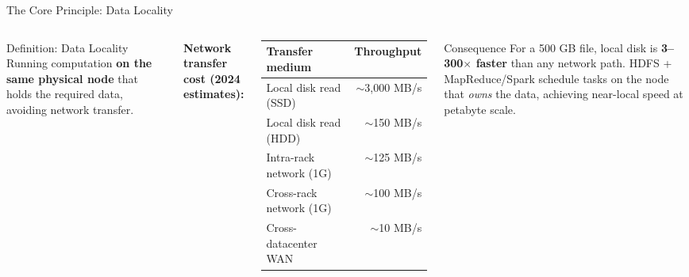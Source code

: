\documentclass[aspectratio=169,10pt]{beamer}
\begin{document}
\begin{frame}{The Core Principle: Data Locality}
  \begin{columns}[T]
      \begin{block}{Definition: Data Locality}
        Running computation \textbf{on the same physical node} that holds the required data, avoiding network transfer.
      \end{block}
      \vspace{6pt}
      \textbf{Network transfer cost (2024 estimates):}
      \vspace{4pt}
      \renewcommand{\arraystretch}{1.25}
      \begin{tabular}{p{3.0cm}r}
        \toprule
        \textbf{Transfer medium} & \textbf{Throughput} \\
        \midrule
        Local disk read (SSD)    & $\sim$3{,}000 MB/s \\
        Local disk read (HDD)    & $\sim$150 MB/s \\
        Intra-rack network (1G)  & $\sim$125 MB/s \\
        Cross-rack network (1G)  & $\sim$100 MB/s \\
        Cross-datacenter WAN     & $\sim$10 MB/s \\
        \bottomrule
      \end{tabular}
      \vspace{6pt}
      \begin{alertblock}{Consequence}
        For a 500 GB file, local disk is \textbf{3--300$\times$ faster} than any network path.  HDFS + MapReduce/Spark schedule tasks on the node that \emph{owns} the data, achieving near-local speed at petabyte scale.
      \end{alertblock}


\end{columns}
\end{frame}
\end{document}
